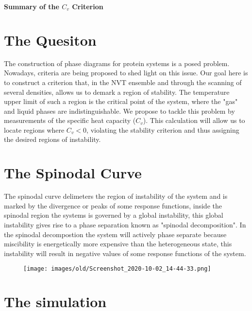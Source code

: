 \documentclass[12pt,letterpaper]{article}
\begin{document}
\textbf{\Large Summary of the $C_v$ Criterion}

\tableofcontents

\section{The Quesiton}
The construction of phase diagrams for protein systems is a posed problem. Nowadays, criteria are being proposed to shed light on this issue. 
Our goal here is to construct a criterion that, in the NVT ensemble and through the scanning of several densities, allows us to demark a region of stability. 
The temperature upper limit of such a region is the critical point of the system, where the "gas" and liquid phases are indistinguishable. 
We propose to tackle this problem by measurements of the specific heat capacity ($C_{v}$). 
This calculation will allow us to locate regions where $C_{v}<0$, violating the stability criterion and thus assigning the desired regions of instability.

    
\section{The Spinodal Curve} \label{spinodal}
The spinodal curve delimeters the region of instability of the system and is marked by the divergence or peaks of some response functions, inside the spinodal region the systems is governed by a global instability, this global instability gives rise to a phase separation known as "spinodal decomposition". In the spinodal decompostion the system will actively phase separate because miscibility is energetically more expensive than the heterogeneous state, this instability will result in negative values of some response functions of the system. %
 \begin{figure}[H]
        \centering
        \texttt{[image: images/old/Screenshot\_2020-10-02\_14-44-33.png]}
        \label{spinodalscheme}
    \end{figure}

    
\section{The simulation}\label{simulation}
\end{document}
